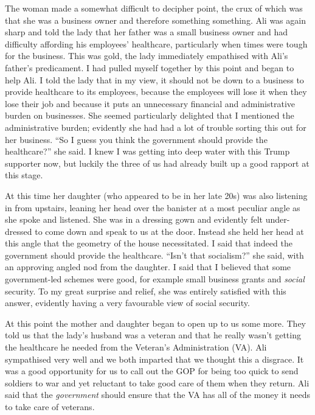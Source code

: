 \documentclass[]{book}
\begin{document}
The woman made a somewhat difficult to decipher point, the crux of which was that she was a business owner and therefore something something. Ali was again sharp and told the lady that her father was a small business owner and had difficulty affording his employees' healthcare, particularly when times were tough for the business. This was gold, the lady immediately empathised with Ali's father's predicament. I had pulled myself together by this point and began to help Ali. I told the lady that in my view, it should not be down to a business to provide healthcare to its employees, because the employees will lose it when they lose their job and because it puts an unnecessary financial and administrative burden on businesses. She seemed particularly delighted that I mentioned the administrative burden; evidently she had had a lot of trouble sorting this out for her business. ``So I guess you think the government should provide the healthcare?'' she said. I knew I was getting into deep water with this Trump supporter now, but luckily the three of us had already built up a good rapport at this stage.

At this time her daughter (who appeared to be in her late 20s) was also listening in from upstairs, leaning her head over the banister at a most peculiar angle as she spoke and listened. She was in a dressing gown and evidently felt under-dressed to come down and speak to us at the door. Instead she held her head at this angle that the geometry of the house necessitated. I said that indeed the government should provide the healthcare. ``Isn't that socialism?'' she said, with an approving angled nod from the daughter. I said that I believed that some government-led schemes were good, for example small business grants and \emph{social} security. To my great surprise and relief, she was entirely satisfied with this answer, evidently having a very favourable view of social security.

At this point the mother and daughter began to open up to us some more. They told us that the lady's husband was a veteran and that he really wasn't getting the healthcare he needed from the Veteran's Administration (VA). Ali sympathised very well and we both imparted that we thought this a disgrace. It was a good opportunity for us to call out the GOP for being too quick to send soldiers to war and yet reluctant to take good care of them when they return. Ali said that the \emph{government} should ensure that the VA has all of the money it needs to take care of veterans.
\end{document}
